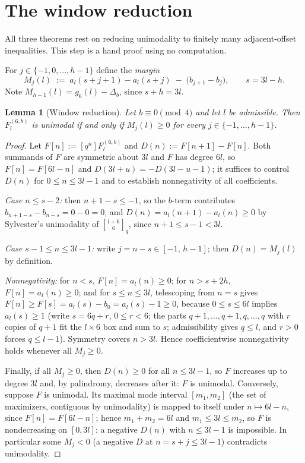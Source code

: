 \documentclass[11pt,reqno]{article}
\newtheorem{lemma}[theorem]{Lemma}
\theoremstyle{definition}
\newcommand{\ggbrack}[2]{\genfrac{[}{]}{0pt}{}{#1}{#2}_q}
\begin{document}
\section{The window reduction}\label{sec:window}
All three theorems rest on reducing unimodality to finitely many adjacent-offset inequalities. This step is a hand proof using no computation.

For $j\in\{-1,0,\dots,h-1\}$ define the \emph{margin}
\[
M_j(l)\;:=\;a_l(s+j+1)-a_l(s+j)\;-\;\bigl(b_{j+1}-b_j\bigr),
\qquad s=3l-h .
\]
Note $M_{h-1}(l)=g_6(l)-\Delta_b$, since $s+h=3l$.

\begin{lemma}[Window reduction]\label{lem:window}
Let $b\equiv 0\pmod 4$ and let $l$ be admissible. Then $F^{(6,b)}_l$ is unimodal if and only if
$M_j(l)\ge 0$ for every $j\in\{-1,\dots,h-1\}$.
\end{lemma}
\begin{proof}
Let $F[n]:=[q^n]F^{(6,b)}_l$ and $D(n):=F[n+1]-F[n]$. Both summands of $F$ are symmetric about $3l$ and $F$ has degree $6l$, so $F[n]=F[6l-n]$ and $D(3l+u)=-D(3l-u-1)$; it suffices to control $D(n)$ for $0\le n\le 3l-1$ and to establish nonnegativity of all coefficients.

\emph{Case $n\le s-2$:} then $n+1-s\le -1$, so the $b$-term contributes $b_{n+1-s}-b_{n-s}=0-0=0$, and $D(n)=a_l(n+1)-a_l(n)\ge0$ by Sylvester's unimodality of $\ggbrack{l+6}{6}$, since $n+1\le s-1<3l$.

\emph{Case $s-1\le n\le 3l-1$:} write $j=n-s\in[-1,\,h-1]$; then $D(n)=M_j(l)$ by definition.

\emph{Nonnegativity:} for $n<s$, $F[n]=a_l(n)\ge0$; for $n>s+2h$, $F[n]=a_l(n)\ge0$; and for $s\le n\le 3l$, telescoping from $n=s$ gives $F[n]\ge F[s]=a_l(s)-b_0=a_l(s)-1\ge0$, because $0\le s\le 6l$ implies $a_l(s)\ge1$ (write $s=6q+r$, $0\le r<6$; the parts $q{+}1,\dots,q{+}1,q,\dots,q$ with $r$ copies of $q{+}1$ fit the $l\times6$ box and sum to $s$; admissibility gives $q\le l$, and $r>0$ forces $q\le l-1$). Symmetry covers $n>3l$. Hence coefficientwise nonnegativity holds whenever all $M_j\ge0$.

Finally, if all $M_j\ge0$, then $D(n)\ge0$ for all $n\le 3l-1$, so $F$ increases up to degree $3l$ and, by palindromy, decreases after it: $F$ is unimodal. Conversely, suppose $F$ is unimodal. Its maximal mode interval $[m_1,m_2]$ (the set of maximizers, contiguous by unimodality) is mapped to itself under $n\mapsto 6l-n$, since $F[n]=F[6l-n]$; hence $m_1+m_2=6l$ and $m_1\le 3l\le m_2$, so $F$ is nondecreasing on $[0,3l]$: a negative $D(n)$ with $n\le 3l-1$ is impossible. In particular some $M_j<0$ (a negative $D$ at $n=s+j\le 3l-1$) contradicts unimodality.
\end{proof}
\end{document}
